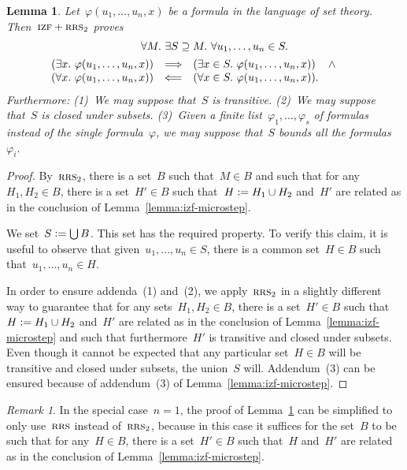 \documentclass[oneside,reqno]{amsart}
\theoremstyle{definition}
\theoremstyle{plain}
\newtheorem{lemma}[defn]{Lemma}
\theoremstyle{remark}
\newtheorem{rem}[defn]{Remark}
\newcommand{\defeq}{\vcentcolon=}
\renewcommand{\_}{\mathpunct{.}\,}
\newcommand{\?}{\,{:}\,}
\newcommand{\IZF}{\textsc{izf}}
\newcommand{\RRS}{\textsc{rrs}}
\begin{document}
\begin{lemma}\label{lemma:izf-smallstep}
Let~$\varphi(u_1,\ldots,u_n,x)$ be a formula in the language of set
theory. Then~$\IZF+\RRS_2$ proves
\begin{multline*}
  {\qquad}\forall M\_
  \exists S \supseteq M\_
  \forall u_1,\ldots,u_n \in S\_ \\
  \begin{array}{@{}rcl@{}}
  (\exists x\_ \varphi(u_1,\ldots,u_n,x)) &\Longrightarrow&
  (\exists x \in S\_ \varphi(u_1,\ldots,u_n,x)) \quad\mathop{\wedge} \\
  (\forall x\_ \varphi(u_1,\ldots,u_n,x)) &\Longleftarrow&
  (\forall x \in S\_ \varphi(u_1,\ldots,u_n,x)).\end{array}
  {\qquad}
\end{multline*}
Furthermore: (1)~We may suppose that~$S$ is transitive. (2)~We may suppose
that~$S$ is closed under subsets. (3)~Given a finite
list~$\varphi_1,\ldots,\varphi_s$ of formulas instead of the single
formula~$\varphi$, we may suppose that~$S$ bounds all the
formulas~$\varphi_i$.
\end{lemma}

\begin{proof}By~$\RRS_2$, there is a set~$B$ such that~$M \in B$ and such that
for any~$H_1, H_2 \in B$, there is a set~$H' \in B$ such that~$H \defeq H_1
\cup H_2$ and~$H'$ are related as in the conclusion of Lemma~\ref{lemma:izf-microstep}.

We set~$S \defeq \bigcup B$. This set has the required property. To verify
this claim, it is useful to observe that given~$u_1,\ldots,u_n \in S$, there is a
common set~$H \in B$ such that~$u_1,\ldots,u_n \in H$.

In order to ensure addenda~(1) and~(2), we apply~$\RRS_2$ in a slightly
different way to guarantee that for any sets~$H_1, H_2 \in B$, there is a
set~$H' \in B$ such that~$H \defeq H_1 \cup H_2$ and~$H'$ are related as in the
conclusion of Lemma~\ref{lemma:izf-microstep} and such that furthermore~$H'$ is
transitive and closed under subsets. Even though it cannot be expected that any
particular set~$H \in B$ will be transitive and closed under subsets, the
union~$S$ will. Addendum~(3) can be ensured because of addendum~(3) of
Lemma~\ref{lemma:izf-microstep}.
\end{proof}

\begin{rem}\label{rem:izf-smallstep-1}
In the special case~$n = 1$, the proof of Lemma~\ref{lemma:izf-smallstep} can
be simplified to only use~$\RRS$ instead of~$\RRS_2$, because in this case it
suffices for the set~$B$ to be such that for any~$H \in B$, there is a set~$H'
\in B$ such that~$H$ and~$H'$ are related as in the conclusion of
Lemma~\ref{lemma:izf-microstep}.
\end{rem}
\end{document}
